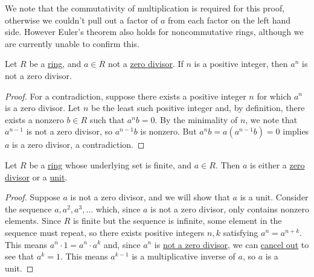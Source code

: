 \documentclass{scrartcl}
\begin{document}
We note that the commutativity of multiplication is required for this proof, otherwise we couldn't pull out a factor of
$a$ from each factor on the left hand side.
However Euler's theorem also holds for noncommutative rings, although we are currently unable to confirm this.

\begin{proposition}
    \label{prop:power of zero divisor is not zero divisor}
    Let $R$ be a \hyperref[def:ring]{ring}, and $a\in R$ not a \hyperref[def:zero divisor]{zero divisor}.
    If $n$ is a positive integer, then $a^n$ is not a zero divisor.
\end{proposition}

\begin{proof}
    For a contradiction, suppose there exists a positive integer $n$ for which $a^n$ is a zero divisor.
    Let $n$ be the least such positive integer and, by definition, there exists a nonzero $b\in R$ such that $a^nb=0$.
    By the minimality of $n$, we note that $a^{n-1}$ is not a zero divisor, so $a^{n-1}b$ is nonzero.
    But $a^nb=a(a^{n-1}b)=0$ implies $a$ is a zero divisor, a contradiction.
\end{proof}

\begin{proposition}
    Let $R$ be a \hyperref[def:ring]{ring} whose underlying set is finite, and $a\in R$.
    Then $a$ is either a \hyperref[def:zero divisor]{zero divisor} or a \hyperref[def:unit]{unit}.
\end{proposition}

\begin{proof}
    Suppose $a$ is not a zero divisor, and we will show that $a$ is a unit.
    Consider the sequence $a,a^2,a^3,\dots$ which, since $a$ is not a zero divisor, only contains nonzero elements.
    Since $R$ is finite but the sequence is infinite, some element in the sequence must repeat, so there exists
    positive integers $n,k$ satisfying $a^n=a^{n+k}$.
    This means $a^n\cdot 1=a^n\cdot a^k$ and, since $a^n$ is
    \hyperref[prop:power of zero divisor is not zero divisor]{not a zero divisor}, we can
    \hyperref[prop:cancellation iff not zero divisor]{cancel out} to see that $a^k=1$.
    This means $a^{k-1}$ is a multiplicative inverse of $a$, so $a$ is a unit.
\end{proof}
\end{document}
